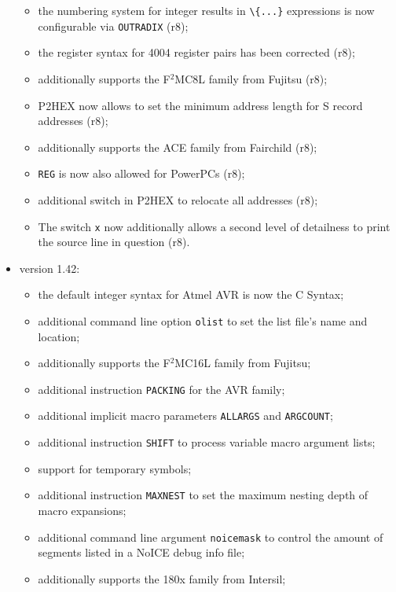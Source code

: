 \documentclass[12pt,twoside]{report}
\newcommand{\tty}[1]{{\tt #1}}
\begin{document}
\begin{itemize}
{\begin{itemize}
{            be made in C notation (r8);}
      \item{the numbering system for integer results in \verb!\{...}!
            expressions is now configurable via \tty{OUTRADIX} (r8);}
      \item{the register syntax for 4004 register pairs has been corrected
            (r8);}
      \item{additionally supports the F$^{2}$MC8L family from Fujitsu
            (r8);}
      \item{P2HEX now allows to set the minimum address length for S
            record addresses (r8);}
      \item{additionally supports the ACE family from Fairchild (r8);}
      \item{{\tt REG} is now also allowed for PowerPCs (r8);}
      \item{additional switch in P2HEX to relocate all addresses (r8);}
      \item{The switch \tty{x} now additionally allows a second level
            of detailness to print the source line in question (r8).}
      \end{itemize}}
\item{version 1.42:
      \begin{itemize}
      \item{the default integer syntax for Atmel AVR is now the C Syntax;}
      \item{additional command line option {\tt olist} to set the
            list file's name and location;}
      \item{additionally supports the F$^{2}$MC16L family from Fujitsu;}
      \item{additional instruction {\tt PACKING} for the AVR family;}
      \item{additional implicit macro parameters {\tt ALLARGS} and
            {\tt ARGCOUNT};}
      \item{additional instruction {\tt SHIFT} to process variable macro
            argument lists;}
      \item{support for temporary symbols;}
      \item{additional instruction {\tt MAXNEST} to set the maximum
            nesting depth of macro expansions;}
      \item{additional command line argument {\tt noicemask} to control
            the amount of segments listed in a NoICE debug info file;}
      \item{additionally supports the 180x family from Intersil;}

\end{itemize}}
\end{itemize}
\end{document}
